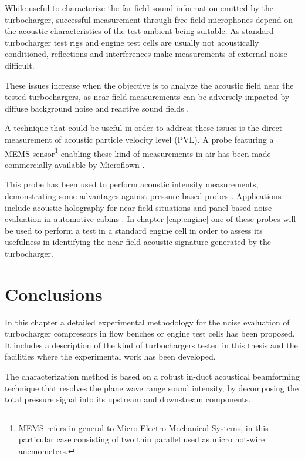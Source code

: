 While useful to characterize the far field sound information emitted by the turbocharger, successful measurement through free-field microphones depend on the acoustic characteristics of the test ambient being suitable. As standard turbocharger test rigs and engine test cells are usually not acoustically conditioned, reflections and interferences make measurements of external noise difficult. 

These issues increase when the objective is to analyze the acoustic field near the tested turbochargers, as near-field measurements can be adversely impacted by diffuse background noise and reactive sound fields \cite{jacobsen1989active,elliot1981errors}. 

A technique that could be useful in order to address these issues is the direct measurement of acoustic particle velocity level (PVL). A probe featuring a MEMS sensor\footnote{MEMS refers in general to Micro Electro-Mechanical Systems, in this particular case consisting of two thin parallel used as micro hot-wire anemometers.} enabling these kind of measurements in air has been made commercially available by Microflown \cite{debree1992micro}. 

This probe has been used to perform acoustic intensity measurements, demonstrating some advantages against pressure-based probes \cite{jacobsen2005comparison}. Applications include acoustic holography for near-field situations \cite{comesana2013scan} and panel-based noise evaluation in automotive cabins \cite{Wolff2009PU}. In chapter \ref{cap:engine} one of these probes will be used to perform a test in a standard engine cell in order to assess its usefulness in identifying the near-field acoustic signature generated by the turbocharger.

\section{Conclusions}
\label{sec:conclusions}

In this chapter a detailed experimental methodology for the noise evaluation of turbocharger compressors in flow benches or engine test cells has been proposed. It includes a description of the kind of turbochargers tested in this thesis and the facilities where the experimental work has been developed.

The characterization method is based on a robust in-duct acoustical beamforming technique that resolves the plane wave range sound intensity, by decomposing the total pressure signal into its upstream and downstream components.

